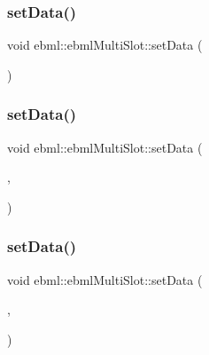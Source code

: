 \mbox{\label{classebml_1_1ebmlMultiSlot_ae5c436b93c6f810bceda911890606e88}} 
\subsubsection{\texorpdfstring{set\+Data()}{setData()}\hspace{0.1cm}{\footnotesize\ttfamily [4/6]}}
{\footnotesize\ttfamily void ebml\+::ebml\+Multi\+Slot\+::set\+Data (\begin{DoxyParamCaption}\item[{\mbox{\hyperlink{namespaceebml_a4317d4c495715eced3ed448c2d05caeb}{slot\+Arg\+\_\+d}} \&\&}]{ }\end{DoxyParamCaption})}

\mbox{\label{classebml_1_1ebmlMultiSlot_a8a54cc97efcae5cad451703f1e95f82e}} 
\subsubsection{\texorpdfstring{set\+Data()}{setData()}\hspace{0.1cm}{\footnotesize\ttfamily [5/6]}}
{\footnotesize\ttfamily void ebml\+::ebml\+Multi\+Slot\+::set\+Data (\begin{DoxyParamCaption}\item[{const \mbox{\hyperlink{namespaceebml_ae432575dfbb3e141ce897442794f0ca5}{slot\+Arg\+\_\+l}} \&}]{,  }\item[{const \mbox{\hyperlink{namespaceebml_a4317d4c495715eced3ed448c2d05caeb}{slot\+Arg\+\_\+d}} \&}]{ }\end{DoxyParamCaption})}

\mbox{\label{classebml_1_1ebmlMultiSlot_a762c96dfeff8e877b6c9d40fdda6d0d2}} 
\subsubsection{\texorpdfstring{set\+Data()}{setData()}\hspace{0.1cm}{\footnotesize\ttfamily [6/6]}}
{\footnotesize\ttfamily void ebml\+::ebml\+Multi\+Slot\+::set\+Data (\begin{DoxyParamCaption}\item[{\mbox{\hyperlink{namespaceebml_ae432575dfbb3e141ce897442794f0ca5}{slot\+Arg\+\_\+l}} \&\&}]{,  }\item[{\mbox{\hyperlink{namespaceebml_a4317d4c495715eced3ed448c2d05caeb}{slot\+Arg\+\_\+d}} \&\&}]{ }\end{DoxyParamCaption})}



